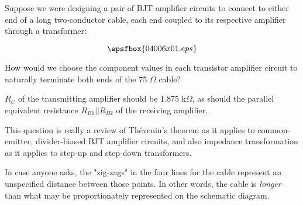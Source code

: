 

Suppose we were designing a pair of BJT amplifier circuits to connect to either end of a long two-conductor cable, each end coupled to its respective amplifier through a transformer:

$$\epsfbox{04006x01.eps}$$

How would we choose the component values in each transistor amplifier circuit to naturally terminate both ends of the 75 $\Omega$ cable?







$R_C$ of the transmitting amplifier should be 1.875 k$\Omega$, as should the parallel equivalent resistance $R_{B1} || R_{B2}$ of the receiving amplifier.







This question is really a review of Th\'evenin's theorem as it applies to common-emitter, divider-biased BJT amplifier circuits, and also impedance transformation as it applies to step-up and step-down transformers. 

In case anyone asks, the "zig-zags" in the four lines for the cable represent an unspecified distance between those points.  In other words, the cable is {\it longer} than what may be proportionately represented on the schematic diagram.





